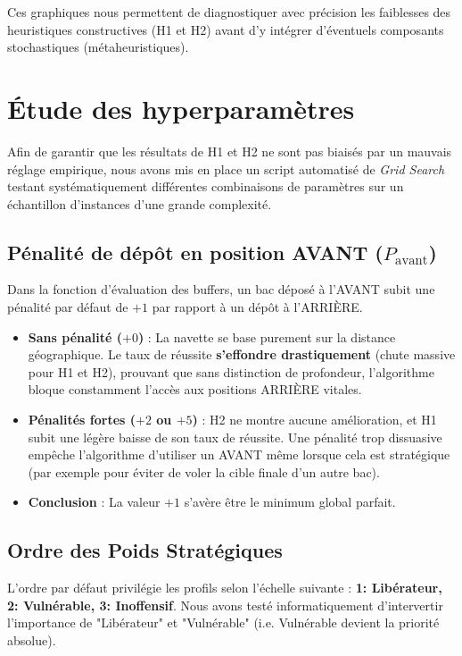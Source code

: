 \documentclass[12pt,a4paper]{article}
\begin{document}
Ces graphiques nous permettent de diagnostiquer avec précision les faiblesses des heuristiques constructives (H1 et H2) avant d'y intégrer d'éventuels composants stochastiques (métaheuristiques).

\section{Étude des hyperparamètres}

Afin de garantir que les résultats de H1 et H2 ne sont pas biaisés par un mauvais réglage empirique, nous avons mis en place un script automatisé de \emph{Grid Search} testant systématiquement différentes combinaisons de paramètres sur un échantillon d'instances d'une grande complexité. 

\subsection{Pénalité de dépôt en position AVANT ($P_{\text{avant}}$)}
Dans la fonction d'évaluation des buffers, un bac déposé à l'AVANT subit une pénalité par défaut de $+1$ par rapport à un dépôt à l'ARRIÈRE. 
\begin{itemize}[noitemsep]
  \item \textbf{Sans pénalité ($+0$)} : La navette se base purement sur la distance géographique. Le taux de réussite \textbf{s'effondre drastiquement} (chute massive pour H1 et H2), prouvant que sans distinction de profondeur, l'algorithme bloque constamment l'accès aux positions ARRIÈRE vitales.
  \item \textbf{Pénalités fortes ($+2$ ou $+5$)} : H2 ne montre aucune amélioration, et H1 subit une légère baisse de son taux de réussite. Une pénalité trop dissuasive empêche l'algorithme d'utiliser un AVANT même lorsque cela est stratégique (par exemple pour éviter de voler la cible finale d'un autre bac).
  \item \textbf{Conclusion} : La valeur $+1$ s'avère être le minimum global parfait.
\end{itemize}

\subsection{Ordre des Poids Stratégiques}
L'ordre par défaut privilégie les profils selon l'échelle suivante : \textbf{1: Libérateur, 2: Vulnérable, 3: Inoffensif}.
Nous avons testé informatiquement d'intervertir l'importance de "Libérateur" et "Vulnérable" (i.e. Vulnérable devient la priorité absolue). 
\end{document}
